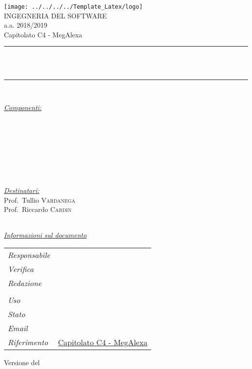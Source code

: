 \begin{titlepage}
\begin{center}
\texttt{[image: ../../../../Template\_Latex/logo]}\\
{\large INGEGNERIA DEL SOFTWARE \\ a.a. 2018/2019}\\[0.5cm]
{\large Capitolato C4 - MegAlexa}\\
\rule{\linewidth}{0.5mm} \\[0.4cm]
{ \huge \bfseries \thetitle \\[0.4cm] } %
\rule{\linewidth}{0.5mm} \\[1.cm]
\noindent
\begin{minipage}{0.4\textwidth}
	\begin{flushleft} \large
		\underline{\emph{Componenti:}}\\[0.2cm]
		\sonia\\
		\alberto \\
		\andrea  \\
		\alessandro \\
		\matteo  \\ 
		\pardeep \\  
		\luca \\
	\end{flushleft}
\end{minipage}
\begin{minipage}{0.4\textwidth}
  \begin{flushright} \large
    \underline{\emph{Destinatari:}} \\[0.2cm]
    Prof.~Tullio \textsc{Vardanega}\\
    Prof.\hspace{0.31cm}~Riccardo \textsc{Cardin}\\
    \proposer
  \end{flushright}
\end{minipage}\\[0.8cm]

\underline{\emph{Informazioni sul documento}} \\[0.2cm]
\begin{tabular}{ll}
	\emph{Responsabile} & \resp \\
	\emph{Verifica} & \verif \\
	\emph{Redazione} & \editorfrow \\
					 & \editorsrow \\  
	\emph{Uso} & \usage\\
	\emph{Stato} & \status\\
	\emph{Email} & \href{mailto:\groupEmail} {\groupEmail}\\
	\emph{Riferimento} & \href{https://www.math.unipd.it/~tullio/IS-1/2018/Progetto/C4.pdf}{Capitolato C4 - MegAlexa}
\end{tabular}
	\descript %
\vfill
{\large Versione \theversion{} del\\ \thedate} %
\end{center}
\end{titlepage}
